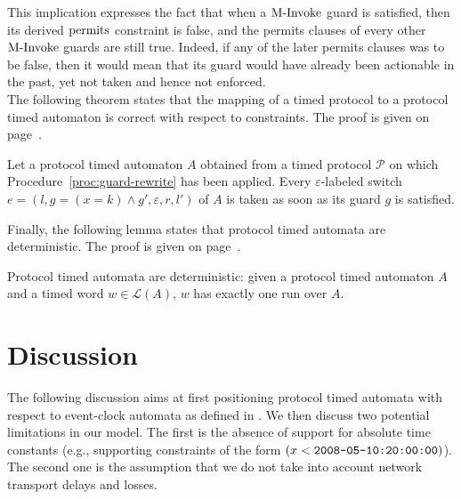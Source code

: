 This implication expresses the fact that when a $\mbox{M-Invoke}$ guard is satisfied, then its derived $\operatorname{permits}$ constraint is false, and the permits clauses of every other $\mbox{M-Invoke}$ guards are still true. Indeed, if any of the later permits clauses was to be false, then it would mean that its guard would have already been actionable in the past, yet not taken and hence not enforced.\\

The following theorem states that the mapping of a timed protocol to a protocol timed automaton is correct with respect to \MInvoke constraints. The proof is given on page~\pageref{proof:mi-enforcement}.

\begin{theorem}
Let a protocol timed automaton $A$ obtained from a timed protocol $\mathcal{P}$ on which Procedure~\ref{proc:guard-rewrite} has been applied.
Every $\varepsilon$-labeled switch $e = (l, g = (x = k) \wedge g', \varepsilon, r, l')$ of $A$ is taken as soon as its guard $g$ is satisfied.
\label{thm:mi-enforcement}
\end{theorem}

Finally, the following lemma states that protocol timed automata are deterministic. The proof is given on page~\pageref{lemma:pta-determinism}.

\begin{lemma}
Protocol timed automata are deterministic: given a protocol timed automaton $A$ and a timed word $w \in \mathcal{L}(A)$, $w$ has exactly one run over $A$.
\label{lemma:pta-determinism}
\end{lemma}


\section{Discussion}


The following discussion aims at first positioning protocol timed automata with respect to event-clock automata as defined in \cite{RALF94}. We then discuss two potential limitations in our model. The first is the absence of support for absolute time constants (e.g., supporting constraints of the form $(x < \mbox{\texttt{2008-05-10:20:00:00}})$). The second one is the assumption that we do not take into account network transport delays and losses. 


